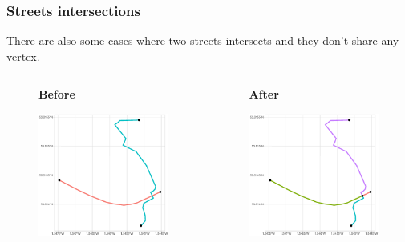\documentclass[c,10pt,pdftex]{beamer}
\begin{document}
\begin{frame}
\frametitle{Streets intersections}
\vspace{-0.75cm}
There are also some cases where two streets intersects and they don't share any vertex.
\begin{columns}
	\begin{column}{0.5\linewidth}
		\begin{figure}
			\centering
			\large \textbf{Before} \par \medskip
			\includegraphics[width = \linewidth, trim = {5.5cm 0 4.5cm 0}, clip]{images/intersections1}
		\end{figure}
	\end{column}
\begin{column}{0.5\linewidth}
	\begin{figure}
		\centering
		\large \textbf{After} \par \medskip
		\includegraphics[width = \linewidth, trim = {5.5cm 0 4.5cm 0}, clip]{images/intersections2}

\end{figure}
\end{column}
\end{columns}
\end{frame}
\end{document}
